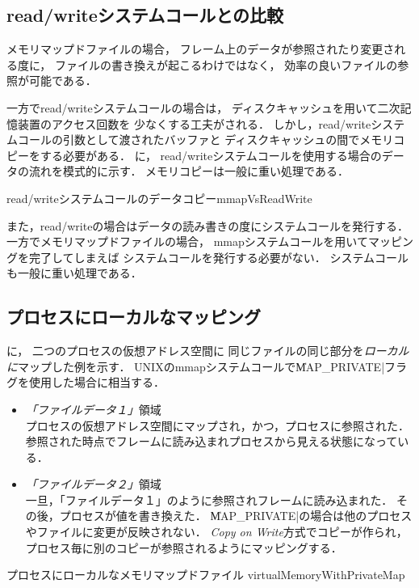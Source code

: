 \subsection{read/writeシステムコールとの比較}
メモリマップドファイルの場合，
フレーム上のデータが参照されたり変更される度に，
ファイルの書き換えが起こるわけではなく，
効率の良いファイルの参照が可能である．

一方でread/writeシステムコールの場合は，
ディスクキャッシュを用いて二次記憶装置のアクセス回数を
少なくする工夫がされる．
しかし，read/writeシステムコールの引数として渡されたバッファと
ディスクキャッシュの間でメモリコピーをする必要がある．
に，
read/writeシステムコールを使用する場合のデータの流れを模式的に示す．
メモリコピーは一般に重い処理である．

         {read/writeシステムコールのデータコピー}{mmapVsReadWrite}

また，read/writeの場合はデータの読み書きの度にシステムコールを発行する．
一方でメモリマップドファイルの場合，
mmapシステムコールを用いてマッピングを完了してしまえば
システムコールを発行する必要がない．
システムコールも一般に重い処理である．

\subsection{プロセスにローカルなマッピング}
に，
二つのプロセスの仮想アドレス空間に
同じファイルの同じ部分を\emph{ローカルに}マップした例を示す．
UNIXのmmapシステムコールで\|MAP_PRIVATE|フラグを使用した場合に相当する．

\begin{itemize}
\item \emph{「ファイルデータ１」}領域 \\
プロセスの仮想アドレス空間にマップされ，かつ，プロセスに参照された．
参照された時点でフレームに読み込まれプロセスから見える状態になっている．
\item \emph{「ファイルデータ２」}領域 \\
一旦，「ファイルデータ１」のように参照されフレームに読み込まれた．
その後，プロセスが値を書き換えた．
\|MAP_PRIVATE|の場合は他のプロセスやファイルに変更が反映されない．
\emph{Copy on Write}方式でコピーが作られ，
プロセス毎に別のコピーが参照されるようにマッピングする．
\end{itemize}

         {プロセスにローカルなメモリマップドファイル}
         {virtualMemoryWithPrivateMap}

